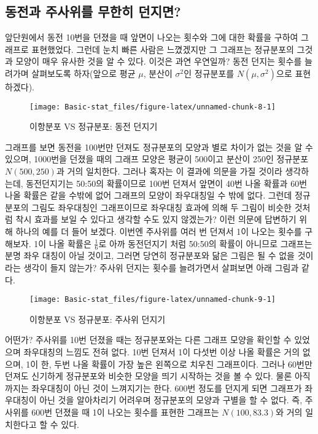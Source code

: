 \documentclass[]{book}
\begin{document}
\subsection{동전과 주사위를 무한히
던지면?}\label{uxb3d9uxc804uxacfc-uxc8fcuxc0acuxc704uxb97c-uxbb34uxd55cuxd788-uxb358uxc9c0uxba74}

앞단원에서 동전 10번을 던졌을 때 앞면이 나오는 횟수와 그에 대한 확률을
구하여 그래프로 표현했었다. 그런데 눈치 빠른 사람은 느꼈겠지만 그
그래프는 정규분포의 그것과 모양이 매우 유사한 것을 알 수 있다. 이것은
과연 우연일까? 동전 던지는 횟수를 늘려가며 살펴보도록 하자(앞으로 평균
\(\mu\), 분산이 \(\sigma^2\)인 정규분포를 \(N(\mu,\sigma^2)\)으로
표현하겠다).

\begin{figure}

{\centering \texttt{[image: Basic-stat\_files/figure-latex/unnamed-chunk-8-1]} 

}

\caption{ 이항분포 VS 정규분포: 동전 던지기}\label{fig:unnamed-chunk-8}
\end{figure}

그래프를 보면 동전을 100번만 던져도 정규분포의 모양과 별로 차이가 없는
것을 알 수 있으며, 1000번을 던졌을 때의 그래프 모양은 평균이 500이고
분산이 250인 정규분포 \(N(500,250)\)과 거의 일치한다. 그러나 혹자는 이
결과에 의문을 가질 것이라 생각하는데, 동전던지기는 50:50의 확률이므로
100번 던져서 앞면이 40번 나올 확률과 60번 나올 확률은 같을 수밖에 없어
그래프의 모양이 좌우대칭일 수 밖에 없다. 그런데 정규분포의 그림도
좌우대칭인 그래프이므로 좌우대칭 효과에 의해 두 그림이 비슷한 것처럼
착시 효과를 보일 수 있다고 생각할 수도 있지 않겠는가? 이런 의문에
답변하기 위해 하나의 예를 더 들어 보겠다. 이번엔 주사위를 여러 번 던져서
1이 나오는 횟수를 구해보자. 1이 나올 확률은 \(\frac{1}{6}\)로 아까
동전던지기 처럼 50:50의 확률이 아니므로 그래프는 분명 좌우 대칭이 아닐
것이고, 그러면 당연히 정규분포와 닮은 그림은 될 수 없을 것이라는 생각이
들지 않는가? 주사위 던지는 횟수를 늘려가면서 살펴보면 아래 그림과 같다.

\begin{figure}

{\centering \texttt{[image: Basic-stat\_files/figure-latex/unnamed-chunk-9-1]} 

}

\caption{ 이항분포 VS 정규분포: 주사위 던지기}\label{fig:unnamed-chunk-9}
\end{figure}

어떤가? 주사위를 10번 던졌을 때는 정규분포와는 다른 그래프 모양을 확인할
수 있었으며 좌우대칭의 느낌도 전혀 없다. 10번 던져서 1이 다섯번 이상
나올 확률은 거의 없으며, 1이 한, 두번 나올 확률이 가장 높은 왼쪽으로
치우친 그래프이다. 그러나 60번만 던져도 신기하게 정규분포와 비슷한
모양을 띄기 시작하는 것을 볼 수 있다. 물론 아직까지는 좌우대칭이 아닌
것이 느껴지기는 한다. 600번 정도를 던지게 되면 그래프가 좌우대칭이 아닌
것을 알아차리기 어려우며 정규분포의 모양과 구별을 할 수 없다. 즉,
주사위를 600번 던졌을 때 1이 나오는 횟수를 표현한 그래프는
\(N(100,83.3)\)와 거의 일치한다고 할 수 있다.
\end{document}
